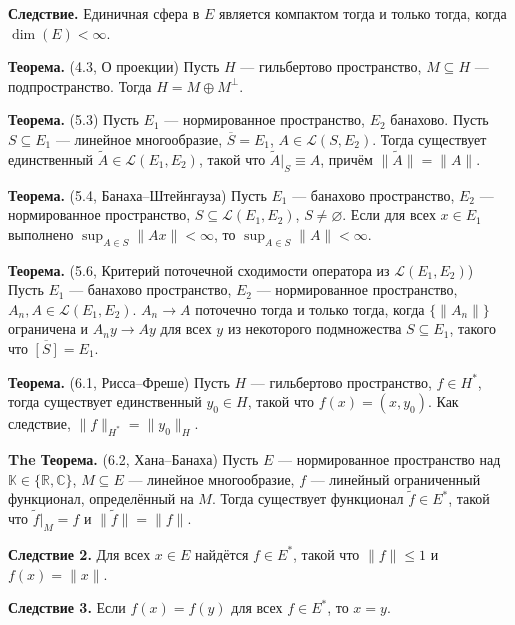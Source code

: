 \documentclass[12pt, a4paper]{article}
\renewcommand{\le}{\leqslant}  %
\renewcommand{\subset}{\subseteq}   %
\begin{document}
\textbf{Следствие.} Единичная сфера в $E$ является компактом тогда и только тогда, когда $\dim(E) < \infty$.
 
 \label{th:4-3} \textbf{Теорема.} (4.3, О проекции) Пусть $H$ --- гильбертово пространство, $M \subset H$ --- подпространство. Тогда $H = M \oplus M^\bot$.
 
 \label{th:5-3} \textbf{Теорема.} (5.3) Пусть $E_1$ --- нормированное пространство, $E_2$ банахово.
Пусть $S \subset E_1$ --- линейное многообразие, $\overline{S} = E_1$, $A \in \mathcal L(S, E_2)$.
Тогда существует единственный $\widetilde A \in \mathcal L(E_1, E_2)$, такой что $\widetilde A|_S \equiv A$, причём $\|\widetilde A\| = \|A\|$.

 \label{th:5-4} \textbf{Теорема.} (5.4, Банаха--Штейнгауза) 
Пусть $E_1$ --- банахово пространство, $E_2$ --- нормированное пространство, $S \subset \mathcal L(E_1, E_2)$, $S \neq \varnothing$.
Если для всех $x \in E_1$ выполнено $\sup_{A \in S} \|Ax\| < \infty$, то $\sup_{A \in S} \|A\| < \infty$.
 
 \label{th:5-6} \textbf{Теорема.} (5.6, Критерий поточечной сходимости оператора из $\mathcal L(E_1, E_2)$)
Пусть $E_1$ --- банахово пространство, $E_2$ --- нормированное пространство, $A_n, A \in \mathcal L(E_1, E_2)$.
$A_n \to A$ поточечно тогда и только тогда, когда $\{\|A_n\|\}$ ограничена и $A_n y \to Ay$ для всех $y$ из некоторого подмножества $S \subset E_1$, такого что $\overline{[S]} = E_1$.

 \label{th:6-1} \textbf{Теорема.} (6.1, Рисса--Фреше) Пусть $H$ --- гильбертово пространство, $f \in H^*$, тогда существует единственный $y_0 \in H$, такой что $f(x) = (x,y_0)$.
Как следствие, $\|f\|_{H^*} = \|y_0\|_H$.
 
\textbf{The Теорема.} (6.2, Хана--Банаха) Пусть $E$ --- нормированное пространство над $\mathbb K \in \{\mathbb R, \mathbb C\}$, $M \subset E$ --- линейное многообразие, $f$ --- линейный ограниченный функционал, определённый на $M$.
Тогда существует функционал $\widetilde f \in E^*$, такой что $\widetilde f|_M = f$ и $\|\widetilde f\| = \|f\|$.
 
 \label{th:hahn-banach-coll-2} \textbf{Следствие 2.} Для всех $x \in E$ найдётся $f \in E^*$, такой что $\|f\| \le 1$ и $f(x) = \|x\|$.
 
 \label{th:hahn-banach-coll-3} \textbf{Следствие 3.} Если $f(x) = f(y)$ для всех $f \in E^*$, то $x = y$.
 
\end{document}
